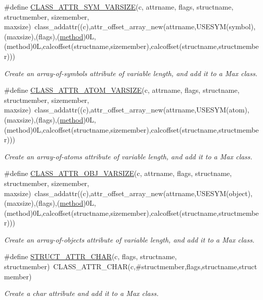 \begin{DoxyCompactItemize}
\#define \hyperlink{group__attr_ga610d6e9410b9c668e4df3ec2bf75f114}{CLASS\_\-ATTR\_\-SYM\_\-VARSIZE}(c, attrname, flags, structname, structmember, sizemember, maxsize)~class\_\-addattr((c),attr\_\-offset\_\-array\_\-new(attrname,USESYM(symbol),(maxsize),(flags),(\hyperlink{group__datatypes_gac26ba0a173b50597f5738132e059b42d}{method})0L,(method)0L,calcoffset(structname,sizemember),calcoffset(structname,structmember)))
\begin{DoxyCompactList}\small\item\em Create an array-\/of-\/symbols attribute of variable length, and add it to a Max class. \item\end{DoxyCompactList}\item 
\#define \hyperlink{group__attr_gad27383a0ceea7d32880ee41452e480d5}{CLASS\_\-ATTR\_\-ATOM\_\-VARSIZE}(c, attrname, flags, structname, structmember, sizemember, maxsize)~class\_\-addattr((c),attr\_\-offset\_\-array\_\-new(attrname,USESYM(atom),(maxsize),(flags),(\hyperlink{group__datatypes_gac26ba0a173b50597f5738132e059b42d}{method})0L,(method)0L,calcoffset(structname,sizemember),calcoffset(structname,structmember)))
\begin{DoxyCompactList}\small\item\em Create an array-\/of-\/atoms attribute of variable length, and add it to a Max class. \item\end{DoxyCompactList}\item 
\#define \hyperlink{group__attr_gab759b34dacbfce67de844f5711f7fc38}{CLASS\_\-ATTR\_\-OBJ\_\-VARSIZE}(c, attrname, flags, structname, structmember, sizemember, maxsize)~class\_\-addattr((c),attr\_\-offset\_\-array\_\-new(attrname,USESYM(object),(maxsize),(flags),(\hyperlink{group__datatypes_gac26ba0a173b50597f5738132e059b42d}{method})0L,(method)0L,calcoffset(structname,sizemember),calcoffset(structname,structmember)))
\begin{DoxyCompactList}\small\item\em Create an array-\/of-\/objects attribute of variable length, and add it to a Max class. \item\end{DoxyCompactList}\item 
\#define \hyperlink{group__attr_ga55ed4d32103cfe94049383ba449e536d}{STRUCT\_\-ATTR\_\-CHAR}(c, flags, structname, structmember)~CLASS\_\-ATTR\_\-CHAR(c,\#structmember,flags,structname,structmember)
\begin{DoxyCompactList}\small\item\em Create a char attribute and add it to a Max class. \item\end{DoxyCompactList}\item 

\end{DoxyCompactItemize}
